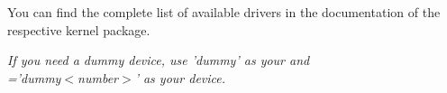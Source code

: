 \begin{description}
{    You can find the complete list of available drivers in the documentation
    of the respective kernel package.

    \emph{If you need a dummy device, use 'dummy' as your  and\\
    ='dummy$<$number$>$' as your device.}

   }
\end{description}
